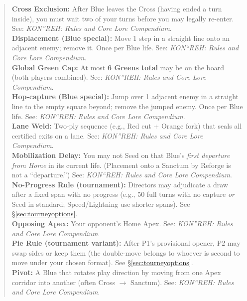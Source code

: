 \documentclass[11pt]{article}
\begin{document}
\begin{quote}
\textbf{Cross Exclusion:} After Blue leaves the Cross (having ended a turn inside), you must wait two of your turns before you may legally re-enter. See: \textit{KON''REH: Rules and Core Lore Compendium}.\\

\textbf{Displacement (Blue special):} Move 1 step in a straight line onto an adjacent enemy; remove it. Once per Blue life. See: \textit{KON``REH: Rules and Core Lore Compendium}.\\

\textbf{Global Green Cap:} At most \textbf{6 Greens total} may be on the board (both players combined). See: \textit{KON''REH: Rules and Core Lore Compendium}.\\

\textbf{Hop-capture (Blue special):} Jump over 1 adjacent enemy in a straight line to the empty square beyond; remove the jumped enemy. Once per Blue life. See: \textit{KON``REH: Rules and Core Lore Compendium}.\\

\textbf{Lane Weld:} Two-ply sequence (e.g., Red cut + Orange fork) that seals all certified exits on a lane. See: \textit{KON''REH: Rules and Core Lore Compendium}.\\

\textbf{Mobilization Delay:} You may not Seed on that Blue's \emph{first departure from Home} in its current life. (Placement onto a Sanctum by Reforge is not a ``departure.'') See: \textit{KON``REH: Rules and Core Lore Compendium}.\\

\textbf{No-Progress Rule (tournament):} Directors may adjudicate a draw after a fixed span with no progress (e.g., 50 full turns with no capture \emph{or} Seed in standard; Speed/Lightning use shorter spans). See \S\ref{sec:tourneyoptions}.\\

\textbf{Opposing Apex:} Your opponent's Home Apex. See: \textit{KON''REH: Rules and Core Lore Compendium}.\\

\textbf{Pie Rule (tournament variant):} After P1's provisional opener, P2 may swap sides or keep them (the double-move belongs to whoever is second to move under your chosen format). See \S\ref{sec:tourneyoptions}.\\

\textbf{Pivot:} A Blue that rotates play direction by moving from one Apex corridor into another (often Cross $\rightarrow$ Sanctum). See: \textit{KON``REH: Rules and Core Lore Compendium}.\\


\end{quote}
\end{document}
